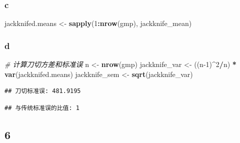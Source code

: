 \documentclass[
]{article}
\newenvironment{Shaded}{\begin{snugshade}}{\end{snugshade}}
\newcommand{\CommentTok}[1]{\textcolor[rgb]{0.56,0.35,0.01}{\textit{#1}}}
\newcommand{\DecValTok}[1]{\textcolor[rgb]{0.00,0.00,0.81}{#1}}
\newcommand{\FunctionTok}[1]{\textcolor[rgb]{0.13,0.29,0.53}{\textbf{#1}}}
\newcommand{\NormalTok}[1]{#1}
\newcommand{\OtherTok}[1]{\textcolor[rgb]{0.56,0.35,0.01}{#1}}
\newcommand{\SpecialCharTok}[1]{\textcolor[rgb]{0.81,0.36,0.00}{\textbf{#1}}}
\begin{document}
\subsubsection{c}\label{c}

\begin{Shaded}
\begin{Highlighting}[]
\NormalTok{jackknifed.means }\OtherTok{\textless{}{-}} \FunctionTok{sapply}\NormalTok{(}\DecValTok{1}\SpecialCharTok{:}\FunctionTok{nrow}\NormalTok{(gmp), jackknife\_mean)}
\end{Highlighting}
\end{Shaded}

\subsubsection{d}\label{d}

\begin{Shaded}
\begin{Highlighting}[]
\CommentTok{\# 计算刀切方差和标准误}
\NormalTok{n }\OtherTok{\textless{}{-}} \FunctionTok{nrow}\NormalTok{(gmp)}
\NormalTok{jackknife\_var }\OtherTok{\textless{}{-}}\NormalTok{ ((n}\DecValTok{{-}1}\NormalTok{)}\SpecialCharTok{\^{}}\DecValTok{2}\SpecialCharTok{/}\NormalTok{n) }\SpecialCharTok{*} \FunctionTok{var}\NormalTok{(jackknifed.means)}
\NormalTok{jackknife\_sem }\OtherTok{\textless{}{-}} \FunctionTok{sqrt}\NormalTok{(jackknife\_var)}
\end{Highlighting}
\end{Shaded}

\begin{verbatim}
## 刀切标准误: 481.9195
\end{verbatim}

\begin{verbatim}
## 与传统标准误的比值: 1
\end{verbatim}

\subsection{6}\label{section-5}
\end{document}
